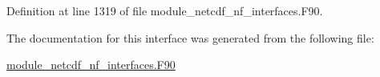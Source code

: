 Definition at line 1319 of file module\+\_\+netcdf\+\_\+nf\+\_\+interfaces.\+F90.



The documentation for this interface was generated from the following file\+:\begin{DoxyCompactItemize}
\item 
\hyperlink{module__netcdf__nf__interfaces_8F90}{module\+\_\+netcdf\+\_\+nf\+\_\+interfaces.\+F90}\end{DoxyCompactItemize}
